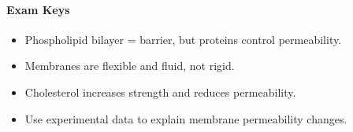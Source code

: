 \paragraph{Exam Keys}
\begin{itemize}
    \item Phospholipid bilayer = barrier, but proteins control permeability.
    \item Membranes are flexible and fluid, not rigid.
    \item Cholesterol increases strength and reduces permeability.
    \item Use experimental data to explain membrane permeability changes.
\end{itemize}